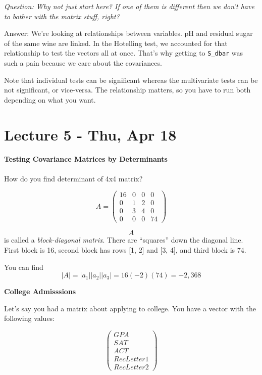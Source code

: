 \documentclass[]{article}
\let\oldparagraph\paragraph
\renewcommand{\paragraph}[1]{\oldparagraph{#1}\mbox{}}
\begin{document}
\emph{Question: Why not just start here? If one of them is different
then we don't have to bother with the matrix stuff, right?}

Answer: We're looking at relationships between variables. pH and
residual sugar of the same wine are linked. In the Hotelling test, we
accounted for that relationship to test the vectors all at once. That's
why getting to \texttt{S\_dbar} was such a pain because we care about
the covariances.

Note that individual tests can be significant whereas the multivariate
tests can be not significant, or vice-versa. The relationship matters,
so you have to run both depending on what you want.

\hypertarget{lecture-5---thu-apr-18}{%
\section{Lecture 5 - Thu, Apr 18}\label{lecture-5---thu-apr-18}}

\hypertarget{testing-covariance-matrices-by-determinants}{%
\paragraph{Testing Covariance Matrices by
Determinants}\label{testing-covariance-matrices-by-determinants}}

How do you find determinant of 4x4 matrix?

\[A = \left(\begin{array}{cccc} 16 & 0 & 0 & 0 \\ 0 & 1 & 2 & 0 \\ 0 & 3 & 4 & 0 \\ 0 & 0 & 0 & 74 \end{array}\right)\]

\[A\] is called a \emph{block-diagonal matrix}. There are ``squares''
down the diagonal line. First block is 16, second block has rows {[}1,
2{]} and {[}3, 4{]}, and third block is 74.

You can find \[| A | = | a_1 |  | a_2 |  | a_3 | = 16(-2)(74) = -2,368\]

\textbf{College Admisssions}

Let's say you had a matrix about applying to college. You have a vector
with the following values:

\[\left(\begin{array}{c} GPA \\ SAT \\ ACT \\ RecLetter1 \\ RecLetter2 \end{array} \right)\]
\end{document}
